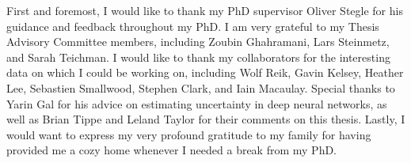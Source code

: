 
\begin{acknowledgements}

First and foremost, I would like to thank my PhD supervisor Oliver Stegle for his guidance and feedback throughout my PhD. I am very grateful to my Thesis Advisory Committee members, including Zoubin Ghahramani, Lars Steinmetz, and Sarah Teichman. I would like to thank my collaborators for the interesting data on which I could be working on, including Wolf Reik, Gavin Kelsey, Heather Lee, Sebastien Smallwood, Stephen Clark, and Iain Macaulay. Special thanks to Yarin Gal for his advice on estimating uncertainty in deep neural networks, as well as Brian Tippe and Leland Taylor for their comments on this thesis. Lastly, I would want to express my very profound gratitude to my family for having provided me a cozy home whenever I needed a break from my PhD.

\end{acknowledgements}
